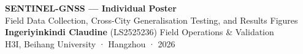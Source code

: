 \documentclass[20pt]{extarticle}
\begin{document}
\noindent
\begin{tcolorbox}[colback=buaaNavy,colframe=buaaNavy,boxrule=0pt,arc=8pt,
                  left=16pt,right=16pt,top=10pt,bottom=10pt]
  \begin{center}
    {\fontsize{46}{54}\bfseries\color{white} SENTINEL-GNSS — Individual Poster}\\[6pt]
    {\fontsize{26}{32}\color{buaaSky}
     Field Data Collection, Cross-City Generalisation Testing, and Results Figures}\\[8pt]
    {\large\color{white}
     \textbf{Ingeriyinkindi Claudine} (LS2525236) \quad Field Operations \& Validation}\\[4pt]
    {\normalsize\color{white!70!buaaSky} H3I, Beihang University · Hangzhou · 2026}
  \end{center}
\end{tcolorbox}
\vspace{0.5cm}
\end{document}
